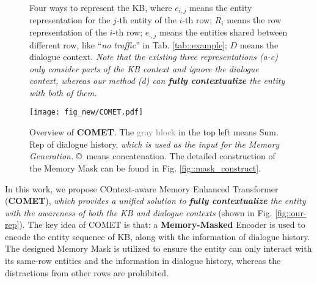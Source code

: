 \documentclass[11pt]{article}
\begin{document}
\begin{figure}[tb]
\begin{center}
\end{center}
\caption{Four ways to represent the KB, where $e_{i,j}$ means the entity representation for the $j$-th entity of the $i$-th row; $R_i$ means the row representation of the $i$-th row; $e_{\cdot,j}$ means the entities shared between different row, like ``\textit{no traffic}'' in Tab. \ref{tab::example}; $D$ means the dialogue context. \textit{Note that the existing three representations (a-c) only consider parts of the KB context and ignore the dialogue context, whereas our method (d) can \textbf{fully contextualize} the entity with both of them.}
}     
\label{fig::diff-kb-rep-comp}     
\end{figure}




\begin{figure*}[htb]
\begin{center}
\texttt{[image: fig\_new/COMET.pdf]}
\caption{Overview of \textbf{COMET}. The \textcolor{gray}{gray block} in the top left means Sum. Rep of dialogue history, \textit{which is used as the input for the Memory Generation.} \copyright \ means concatenation. The detailed construction of the Memory Mask can be found in Fig. \ref{fig::mask_construct}.
}
\label{fig::model_archi}
\end{center}
\end{figure*}

In this work, we propose COntext-aware Memory Enhanced Transformer (\textbf{COMET}), \textit{which provides a unified solution to \textbf{fully contextualize} the entity with the awareness of both the KB and dialogue contexts} (shown in Fig. \ref{fig::our-rep}). 
The key idea of COMET is that: a \textbf{\textbf{Memory-Masked}} Encoder is used to encode the entity sequence of KB, along with the information of dialogue history. The designed Memory Mask is utilized to ensure the entity can only interact with its same-row entities and the information in dialogue history, whereas the distractions from other rows are prohibited.
\end{document}
